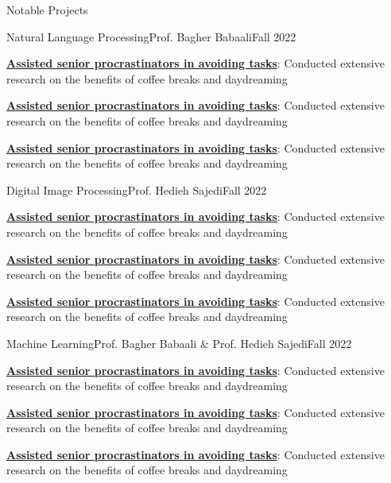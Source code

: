 \documentclass[]{main}
\begin{document}
\begin{section}{Notable Projects}
 \begin{subsection}{Natural Language Processing}{Prof. Bagher Babaali}{Fall 2022}{}
     \item \textbf{\href{https://google.com}{Assisted senior procrastinators in avoiding tasks}}: Conducted extensive research on the benefits of coffee breaks and daydreaming
     \item \textbf{\href{https://google.com}{Assisted senior procrastinators in avoiding tasks}}: Conducted extensive research on the benefits of coffee breaks and daydreaming
     \item \textbf{\href{https://google.com}{Assisted senior procrastinators in avoiding tasks}}: Conducted extensive research on the benefits of coffee breaks and daydreaming
 \end{subsection}

 \begin{subsection}{Digital Image Processing}{Prof. Hedieh Sajedi}{Fall 2022}{}
     \item \textbf{\href{https://google.com}{Assisted senior procrastinators in avoiding tasks}}: Conducted extensive research on the benefits of coffee breaks and daydreaming
     \item \textbf{\href{https://google.com}{Assisted senior procrastinators in avoiding tasks}}: Conducted extensive research on the benefits of coffee breaks and daydreaming
     \item \textbf{\href{https://google.com}{Assisted senior procrastinators in avoiding tasks}}: Conducted extensive research on the benefits of coffee breaks and daydreaming
 \end{subsection}

 \begin{subsection}{Machine Learning}{Prof. Bagher Babaali \& Prof. Hedieh Sajedi}{Fall 2022}{}
     \item \textbf{\href{https://google.com}{Assisted senior procrastinators in avoiding tasks}}: Conducted extensive research on the benefits of coffee breaks and daydreaming
     \item \textbf{\href{https://google.com}{Assisted senior procrastinators in avoiding tasks}}: Conducted extensive research on the benefits of coffee breaks and daydreaming
     \item \textbf{\href{https://google.com}{Assisted senior procrastinators in avoiding tasks}}: Conducted extensive research on the benefits of coffee breaks and daydreaming
 \end{subsection}


\end{section}
\end{document}
